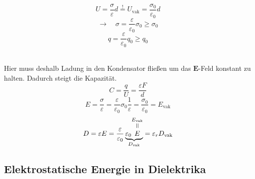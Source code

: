 \documentclass[titlepage,11pt,a4paper,ngerman]{report}
\newcommand{\tx}[1]{\textrm{#1}}
\newcommand{\ub}[1]{\underbrace{#1}}
\newcommand{\verteq}{\rotatebox{90}{$\,=$}}
\newcommand{\equaltoup}[2]{\overset{\scriptstyle\underset{\mkern4mu\verteq}{#2}}{#1}}
\renewcommand{\vec}[1]{\boldsymbol{#1}}
\newcommand{\lcom}[1]{\color{MidnightBlue}#1\color{black}}
\renewcommand{\epsilon}{\varepsilon}
\begin{document}
\begin{minipage}{.5\linewidth}
	\centering
\end{minipage}%
\begin{minipage}{.5\linewidth}
	\begin{equation*}
	U = \frac{\sigma}{\epsilon} d \overset{!}{=} U_{\tx{vak}} = \frac{\sigma_0}{\epsilon_0} d
	\end{equation*}
	\begin{equation*}
	\rightarrow \quad \sigma = \frac{\epsilon}{\epsilon_0} \sigma_0 \ge \sigma_0
	\end{equation*}
	\begin{equation*}
	q = \frac{\epsilon}{\epsilon_0} q_0 \ge q_0
	\end{equation*}
	\vspace{5pt}
\end{minipage}%
\\
\lcom{Hier muss deshalb Ladung in den Kondensator fließen um das $ \vec{E} $-Feld konstant zu halten. Dadurch steigt die Kapazität.}
\begin{equation*}
C = \frac{q}{U} = \frac{\epsilon F}{d}
\end{equation*}
\begin{equation*}
E = \frac{\sigma}{\epsilon} = \frac{\epsilon}{\epsilon_0} \sigma_0 \frac{1}{\epsilon} = \frac{\sigma_0}{\epsilon_0} = E_{\tx{vak}}
\end{equation*}
\begin{equation*}
D = \epsilon E = \frac{\epsilon}{\epsilon_0} \ub{\epsilon_0 \equaltoup{E}{E_{\tx{vak}}}}_{D_{\tx{vak}}} = \epsilon_r D_{\tx{vak}}
\end{equation*}

\subsection{Elektrostatische Energie in Dielektrika}
\end{document}
